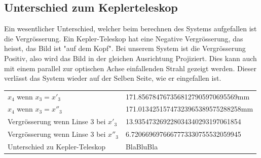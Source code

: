 \documentclass[11pt,twoside,a4paper]{article}
\begin{document}
	\subsection{Unterschied zum Keplerteleskop}
	Ein wesentlicher Unterschied, welcher beim berechnen des Systems aufgefallen ist die Vergrösserung. Ein Kepler-Teleskop hat eine Negative Vergrösserung, das heisst, das Bild ist "auf dem Kopf". Bei unserem System ist die Vergrösserung Positiv, also wird das Bild in der gleichen Ausrichtung Projiziert. Dies kann auch mit einem parallel zur optischen Achse einfallenden Strahl gezeigt werden. Dieser verlässt das System wieder auf der Selben Seite, wie er eingefallen ist.
	\begin{table}
		\centering
		\begin{tabular}{ll}
			\(x_{4}\) wenn \(x_{3} = x'_{3}\) & 171.8567847673568127905970695569mm \\
			\(x_{4}\) wenn \(x_{3} = x''_{3}\) & 171.01342515747323965389575288258mm \\
			Vergrösserung wenn Linse 3 bei \(x'_{3}\) & 13.935473269228034340293197061854 \\
			Vergrösserung wenn Linse 3 bei \(x''_{3}\) & 6.7206696976667773330755532059945 \\
			Unterschied zu Kepler-Teleskop & BlaBluBla \\
		\end{tabular}
	\end{table} \\
\end{document}
